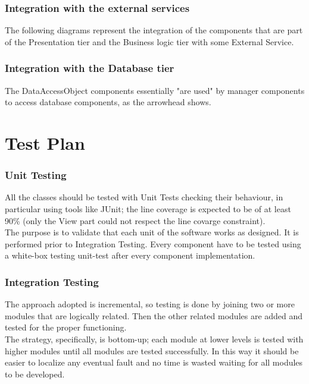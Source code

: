 \documentclass[../DD.tex]{subfiles}
\begin{document}
\subsubsection{Integration with the external services}
The following diagrams represent the integration of the components that are part of the Presentation tier and the Business logic tier with some External Service.


\subsubsection{Integration with the Database tier}
The DataAccessObject components essentially "are used" by manager components to access database components, as the arrowhead shows.

\newpage

\section{Test Plan\label{5.4}}

\subsubsection{Unit Testing\label{5.4.1}}
All the classes should be tested with Unit Tests checking their behaviour, in particular using tools like JUnit; the line coverage is expected to be of at least 90\% (only the View part could not respect the line covarge constraint).\\

The purpose is to validate that each unit of the software works as designed. It is performed prior to Integration Testing. Every component have to be tested using a white-box testing unit-test after every component implementation.


\subsubsection{Integration Testing\label{5.4.2}}

The approach adopted is incremental, so testing is done by joining two or more modules that are logically related. Then the other related modules are added and tested for the proper functioning.\\

The strategy, specifically, is bottom-up; each module at lower levels is tested with higher modules until all modules are tested successfully. In this way it should be easier to localize any eventual fault and no time is wasted waiting for all modules to be developed.
\end{document}
